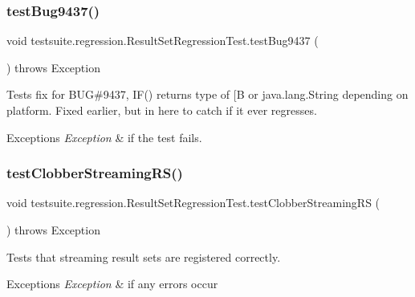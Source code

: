\subsubsection{\texorpdfstring{test\+Bug9437()}{testBug9437()}}
{\footnotesize\ttfamily void testsuite.\+regression.\+Result\+Set\+Regression\+Test.\+test\+Bug9437 (\begin{DoxyParamCaption}{ }\end{DoxyParamCaption}) throws Exception}

Tests fix for B\+UG\#9437, I\+F() returns type of \mbox{[}B or java.\+lang.\+String depending on platform. Fixed earlier, but in here to catch if it ever regresses.


\begin{DoxyExceptions}{Exceptions}
{\em Exception} & if the test fails. \\
\hline
\end{DoxyExceptions}
\mbox{\label{classtestsuite_1_1regression_1_1_result_set_regression_test_a98618c59f0d4f7f13323676c6352cdc8}} 
\subsubsection{\texorpdfstring{test\+Clobber\+Streaming\+R\+S()}{testClobberStreamingRS()}}
{\footnotesize\ttfamily void testsuite.\+regression.\+Result\+Set\+Regression\+Test.\+test\+Clobber\+Streaming\+RS (\begin{DoxyParamCaption}{ }\end{DoxyParamCaption}) throws Exception}

Tests that streaming result sets are registered correctly.


\begin{DoxyExceptions}{Exceptions}
{\em Exception} & if any errors occur \\
\hline
\end{DoxyExceptions}
\mbox{\label{classtestsuite_1_1regression_1_1_result_set_regression_test_a4a5ee07e3208b64df9f192a86b6a4993}} 
